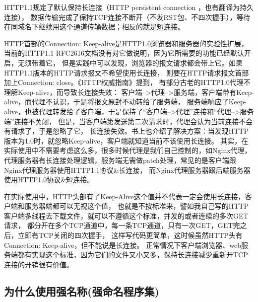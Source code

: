 \documentclass{book}
\begin{document}
HTTP1.1规定了默认保持长连接（HTTP persistent connection ，也有翻译为持久连接），
数据传输完成了保持TCP连接不断开（不发RST包、不四次握手），等待在同域名下继续用这个通道传输数据；相反的就是短连接。

HTTP首部的Connection: Keep-alive是HTTP1.0浏览器和服务器的实验性扩展，
当前的HTTP1.1 RFC2616文档没有对它做说明，因为它所需要的功能已经默认开启，无须带着它，
但是实践中可以发现，浏览器的报文请求都会带上它。如果HTTP1.1版本的HTTP请求报文不希望使用长连接，
则要在HTTP请求报文首部加上Connection: close。《HTTP权威指南》提到，
有部分古老的HTTP1.0代理不理解Keep-alive，而导致长连接失效：
客户端-->代理-->服务端，客户端带有Keep-alive，而代理不认识，于是将报文原封不动转给了服务端，
服务端响应了Keep-alive，也被代理转发给了客户端，于是保持了“客户端-->代理”连接和“代理-->服务端”连接不关闭，
但是，当客户端第发送第二次请求时，代理会认为当前连接不会有请求了，于是忽略了它，
长连接失效。书上也介绍了解决方案：当发现HTTP版本为1.0时，就忽略Keep-alive，客户端就知道当前不该使用长连接。
其实，在实际使用中不需要考虑这么多，很多时候代理是我们自己控制的，如Nginx代理，
代理服务器有长连接处理逻辑，服务端无需做patch处理，常见的是客户端跟Nginx代理服务器使用HTTP1.1协议\&长连接，
而Nginx代理服务器跟后端服务器使用HTTP1.0协议\&短连接。

在实际使用中，HTTP头部有了Keep-Alive这个值并不代表一定会使用长连接，客户端和服务器端都可以无视这个值，
也就是不按标准来，譬如我自己写的HTTP客户端多线程去下载文件，就可以不遵循这个标准，并发的或者连续的多次GET请求，
都分开在多个TCP通道中，每一条TCP通道，只有一次GET，GET完之后，立即有TCP关闭的四次握手，
这样写代码更简单，这时候虽然HTTP头有Connection: Keep-alive，但不能说是长连接。
正常情况下客户端浏览器、web服务端都有实现这个标准，因为它们的文件又小又多，保持长连接减少重新开TCP连接的开销很有价值。

\subsection{为什么使用强名称(强命名程序集)}
\end{document}
